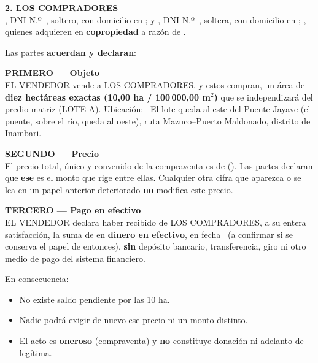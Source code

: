 \documentclass[12pt,a4paper]{article}
\begin{document}
\vspace{0.55em}
\noindent\textbf{2. LOS COMPRADORES}\\[0.2em]
\textbf{\CompradorUnoNombre}, DNI N.º\ \CompradorUnoDNI, soltero, con domicilio en \CompradorUnoDomicilio; y \textbf{\CompradorDosNombre}, DNI N.º\ \CompradorDosDNI, soltera, con domicilio en \CompradorDosDomicilio; \textbf{\CompradorParentesco}, quienes adquieren en \textbf{copropiedad} a razón de \PorcentajeCopropiedad.

\vspace{0.7em}
\noindent Las partes \textbf{acuerdan y declaran}:

\vspace{0.45em}
\noindent\textbf{PRIMERO --- Objeto}\\[0.15em]
EL VENDEDOR vende a LOS COMPRADORES, y estos compran, un área de \textbf{diez hectáreas exactas (10,00 ha / 100\,000,00 m$^2$)} que se independizará del predio matriz (LOTE A). Ubicación: \CriterioRecorte\ El lote queda al este del Puente Jayave (el puente, sobre el río, queda al oeste), ruta Mazuco--Puerto Maldonado, distrito de Inambari.

\vspace{0.45em}
\noindent\textbf{SEGUNDO --- Precio}\\[0.15em]
El precio total, único y convenido de la compraventa es de \textbf{\MontoPago} (\textbf{\MontoPagoLetras}). Las partes declaran que \textbf{ese} es el monto que rige entre ellas. Cualquier otra cifra que aparezca o se lea en un papel anterior deteriorado \textbf{no} modifica este precio.

\vspace{0.45em}
\noindent\textbf{TERCERO --- Pago en efectivo}\\[0.15em]
EL VENDEDOR declara haber recibido de LOS COMPRADORES, a su entera satisfacción, la suma de \textbf{\MontoPago} en \textbf{dinero en efectivo}, en fecha \FechaPago\ (a confirmar si se conserva el papel de entonces), \textbf{sin} depósito bancario, transferencia, giro ni otro medio de pago del sistema financiero.

\vspace{0.25em}
\noindent En consecuencia:
\begin{itemize}[leftmargin=1.2cm,itemsep=0.25em]
\item No existe saldo pendiente por las 10 ha.
\item Nadie podrá exigir de nuevo ese precio ni un monto distinto.
\item El acto es \textbf{oneroso} (compraventa) y \textbf{no} constituye donación ni adelanto de legítima.
\end{itemize}
\end{document}
